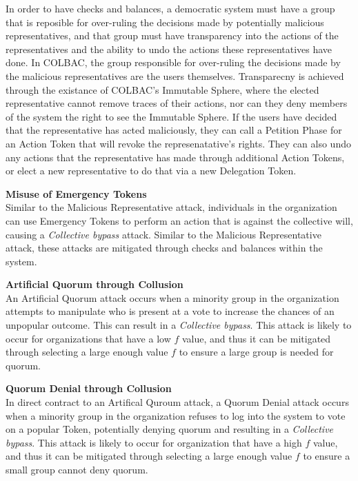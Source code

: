 In order to have checks and balances, a democratic system must have a group that
is reposible for over-ruling the decisions made by potentially malicious
representatives, and that group must have transparency into the actions of the
representatives and the ability to undo the actions these representatives have
done. In COLBAC, the group responsible for over-ruling the decisions made by the
malicious representatives are the users themselves. Transparecny is achieved
through the existance of COLBAC's Immutable Sphere, where the elected
representative cannot remove traces of their actions, nor can they deny members
of the system the right to see the Immutable Sphere. If the users have decided
that the representative has acted maliciously, they can call a Petition Phase
for an Action Token that will revoke the represenatative's rights. They can also
undo any actions that the representative has made through additional Action
Tokens, or elect a new representative to do that via a new Delegation Token.

\noindent\textbf{Misuse of Emergency Tokens}\mbox{}\\
Similar to the Malicious Representative attack, individuals in the organization
can use Emergency Tokens to perform an action that is against the collective
will, causing a \emph{Collective bypass} attack. Similar to the Malicious
Representative attack, these attacks are mitigated through checks and balances
within the system.

\noindent\textbf{Artificial Quorum through Collusion}\mbox{}\\
An Artificial Quorum attack occurs when a minority group in the organization
attempts to manipulate who is present at a vote to increase the chances of an
unpopular outcome. This can result in a \emph{Collective bypass}. This attack is
likely to occur for organizations that have a low $f$ value, and thus it can
be mitigated through selecting a large enough value $f$ to ensure a large group
is needed for quorum. 

\noindent\textbf{Quorum Denial through Collusion}\mbox{}\\
In direct contract to an Artifical Quroum attack, a Quorum Denial attack occurs
when a minority group in the organization refuses to log into the system to vote
on a popular Token, potentially denying quorum and resulting in a
\emph{Collective bypass}. This attack is likely to occur for organization that
have a high $f$ value, and thus it can be mitigated through selecting a large
enough value $f$ to ensure a small group cannot deny quorum.
    

